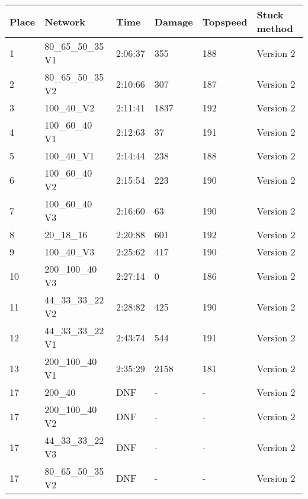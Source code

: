 \documentclass[a4paper,10pt]{scrartcl}
\begin{document}
\begin{table}[H]
\begin{tabular}{llllll}
 \textbf{Place} & \textbf{Network} & \textbf{Time} & \textbf{Damage} & \textbf{Topspeed}  & \textbf{Stuck method} \\ \hline
 1&  80\_65\_50\_35 V1 & 2:06:37 & 355 & 188 & Version 2 \\ \hline
 2& 80\_65\_50\_35 V2  & 2:10:66 & 307 & 187 & Version 2 \\ \hline
 3&  100\_40\_V2 & 2:11:41 & 1837 & 192 & Version 2 \\ \hline
 4& 100\_60\_40 V1 & 2:12:63 & 37 & 191 & Version 2   \\ \hline
 5&  100\_40\_V1  & 2:14:44 & 238 & 188 & Version 2 \\ \hline
 6& 100\_60\_40 V2  & 2:15:54 & 223 & 190 & Version 2 \\ \hline
 7& 100\_60\_40 V3 & 2:16:60  & 63 & 190 & Version 2   \\ \hline
 8& 20\_18\_16  & 2:20:88  & 601 & 192 & Version 2    \\
 9& 100\_40\_V3  & 2:25:62 & 417 & 190 & Version 2 \\ \hline
 10& 200\_100\_40 V3  & 2:27:14 & 0 & 186 & Version 2 \\ \hline
 11& 44\_33\_33\_22 V2  & 2:28:82 & 425 & 190 & Version 2 \\ \hline
 12& 44\_33\_33\_22 V1 & 2:43:74 & 544 & 191 & Version 2 \\ \hline
 13& 200\_100\_40 V1 & 2:35:29 & 2158 & 181 & Version 2 \\ \hline
 17&  200\_40  & DNF & - & - & Version 2   \\ \hline 
 17& 200\_100\_40 V2 & DNF & - & - & Version 2 \\  \hline
 17&  44\_33\_33\_22 V3  & DNF & - & - & Version 2 \\ \hline
 17& 80\_65\_50\_35 V2  & DNF & - & - & Version 2 \\ \hline 
\end{tabular}
\end{table}
\end{document}
